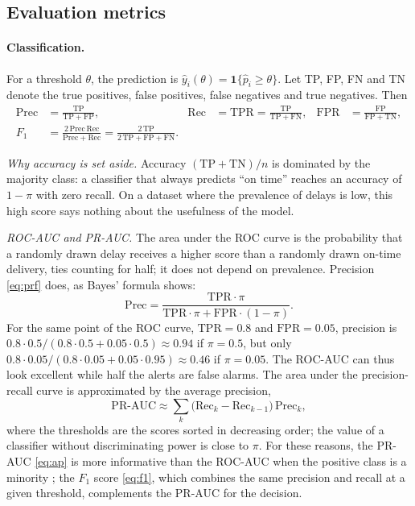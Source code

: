 \documentclass[11pt,a4paper]{article}
\newcommand{\ind}{\mathbf{1}}
\newcommand{\Preci}{\mathrm{Prec}}
\newcommand{\Rapp}{\mathrm{Rec}}
\theoremstyle{definition}
\begin{document}
\subsection{Evaluation metrics}
\label{sec:metriques}

\paragraph{Classification.} For a threshold $\theta$, the prediction is $\hat{y}_i(\theta) = \ind\{\hat{p}_i \ge \theta\}$. Let TP, FP, FN and TN denote the true positives, false positives, false negatives and true negatives. Then
\begin{align}
  \Preci &= \frac{\mathrm{TP}}{\mathrm{TP}+\mathrm{FP}}, &
  \Rapp &= \mathrm{TPR} = \frac{\mathrm{TP}}{\mathrm{TP}+\mathrm{FN}}, &
  \mathrm{FPR} &= \frac{\mathrm{FP}}{\mathrm{FP}+\mathrm{TN}}, \label{eq:prf}\\
  F_1 &= \frac{2\,\Preci\,\Rapp}{\Preci+\Rapp} = \frac{2\,\mathrm{TP}}{2\,\mathrm{TP}+\mathrm{FP}+\mathrm{FN}}. \label{eq:f1}
\end{align}

\emph{Why accuracy is set aside.} Accuracy $(\mathrm{TP}+\mathrm{TN})/n$ is dominated by the majority class: a classifier that always predicts ``on time'' reaches an accuracy of $1-\pi$ with zero recall. On a dataset where the prevalence of delays is low, this high score says nothing about the usefulness of the model.

\emph{ROC-AUC and PR-AUC.} The area under the ROC curve is the probability that a randomly drawn delay receives a higher score than a randomly drawn on-time delivery, ties counting for half; it does not depend on prevalence. Precision \eqref{eq:prf} does, as Bayes' formula shows:
\begin{equation}
  \Preci = \frac{\mathrm{TPR}\cdot\pi}{\mathrm{TPR}\cdot\pi + \mathrm{FPR}\cdot(1-\pi)}.
  \label{eq:prec-bayes}
\end{equation}
For the same point of the ROC curve, $\mathrm{TPR}=0.8$ and $\mathrm{FPR}=0.05$, precision is $0.8\cdot0.5/(0.8\cdot0.5+0.05\cdot0.5)\approx0.94$ if $\pi=0.5$, but only $0.8\cdot0.05/(0.8\cdot0.05+0.05\cdot0.95)\approx0.46$ if $\pi=0.05$. The ROC-AUC can thus look excellent while half the alerts are false alarms. The area under the precision-recall curve is approximated by the average precision,
\begin{equation}
  \mathrm{PR\text{-}AUC} \approx \sum_{k} \bigl(\Rapp_k - \Rapp_{k-1}\bigr)\,\Preci_k,
  \label{eq:ap}
\end{equation}
where the thresholds are the scores sorted in decreasing order; the value of a classifier without discriminating power is close to $\pi$. For these reasons, the PR-AUC \eqref{eq:ap} is more informative than the ROC-AUC when the positive class is a minority \cite{saito2015precision}; the $F_1$ score \eqref{eq:f1}, which combines the same precision and recall at a given threshold, complements the PR-AUC for the decision.
\end{document}

